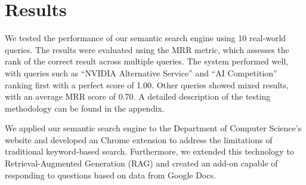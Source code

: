 \section{Results}
We tested the performance of our semantic search engine using 10 real-world queries. The results were evaluated using the MRR metric, which assesses the rank of the correct result across multiple queries. The system performed well, with queries such as “NVIDIA Alternative Service” and “AI Competition” ranking first with a perfect score of 1.00. Other queries showed mixed results, with an average MRR score of 0.70. A detailed description of the testing methodology can be found in the appendix.

We applied our semantic search engine to the Department of Computer Science's website and developed an Chrome extension to address the limitations of traditional keyword-based search. Furthermore, we extended this technology to Retrieval-Augmented Generation (RAG) and created an add-on capable of responding to questions based on data from Google Docs.

